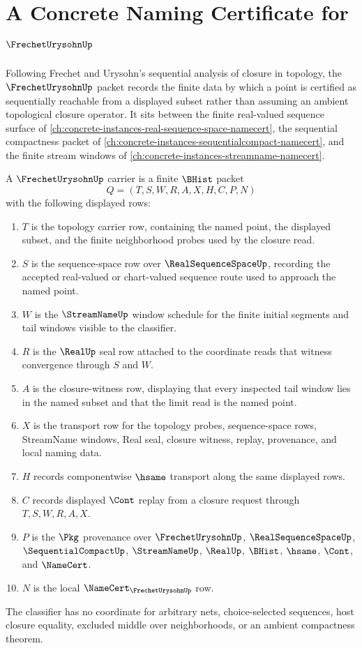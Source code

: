 \chapter{A Concrete Naming Certificate for $\FrechetUrysohnUp$}
\label{ch:concrete-instances-frechet-urysohn-namecert}

Following Frechet and Urysohn's sequential analysis of closure in topology, the $\FrechetUrysohnUp$ packet records the finite data by which a point is certified as sequentially reachable from a displayed subset rather than assuming an ambient topological closure operator. It sits between the finite real-valued sequence surface of \autoref{ch:concrete-instances-real-sequence-space-namecert}, the sequential compactness packet of \autoref{ch:concrete-instances-sequentialcompact-namecert}, and the finite stream windows of \autoref{ch:concrete-instances-streamname-namecert}.

\begin{definition}
\label{def:frechet-urysohn-carrier}
A $\FrechetUrysohnUp$ carrier is a finite $\BHist$ packet
$$
Q=(T,S,W,R,A,X,H,C,P,N)
$$
with the following displayed rows:
\begin{enumerate}
\item $T$ is the topology carrier row, containing the named point, the displayed subset, and the finite neighborhood probes used by the closure read.
\item $S$ is the sequence-space row over $\RealSequenceSpaceUp$, recording the accepted real-valued or chart-valued sequence route used to approach the named point.
\item $W$ is the $\StreamNameUp$ window schedule for the finite initial segments and tail windows visible to the classifier.
\item $R$ is the $\RealUp$ seal row attached to the coordinate reads that witness convergence through $S$ and $W$.
\item $A$ is the closure-witness row, displaying that every inspected tail window lies in the named subset and that the limit read is the named point.
\item $X$ is the transport row for the topology probes, sequence-space rows, StreamName windows, Real seal, closure witness, replay, provenance, and local naming data.
\item $H$ records componentwise $\hsame$ transport along the same displayed rows.
\item $C$ records displayed $\Cont$ replay from a closure request through $T,S,W,R,A,X$.
\item $P$ is the $\Pkg$ provenance over $\FrechetUrysohnUp$, $\RealSequenceSpaceUp$, $\SequentialCompactUp$, $\StreamNameUp$, $\RealUp$, $\BHist$, $\hsame$, $\Cont$, and $\NameCert$.
\item $N$ is the local $\NameCert_{\FrechetUrysohnUp}$ row.
\end{enumerate}
The classifier has no coordinate for arbitrary nets, choice-selected sequences, host closure equality, excluded middle over neighborhoods, or an ambient compactness theorem.
\end{definition}

